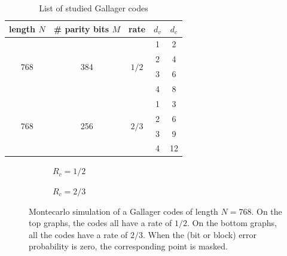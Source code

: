 \begin{table}
    \centering
    \begin{tabular}{c c c c c}
        length $N$           & \# parity bits $M$   & rate                   & $d_v$ & $d_c$ \\
        \hline \hline
        \multirow{4}{*}{768} & \multirow{4}{*}{384} & \multirow{4}{*}{$1/2$} & 1     & 2     \\
                             &                      &                        & 2     & 4     \\
                             &                      &                        & 3     & 6     \\
                             &                      &                        & 4     & 8     \\
        \hline
        \multirow{4}{*}{768} & \multirow{4}{*}{256} & \multirow{4}{*}{$2/3$} & 1     & 3     \\
                             &                      &                        & 2     & 6     \\
                             &                      &                        & 3     & 9     \\
                             &                      &                        & 4     & 12    \\
    \end{tabular}
    \caption{List of studied Gallager codes}
    \label{tab:gallager_codes}
\end{table}


\begin{figure}
    \centering
    \begin{subfigure}{\textwidth}
        \centering
        
        \caption{$R_c = 1/2$}
    \end{subfigure}%

    \begin{subfigure}{\textwidth}
        \centering
        
        \caption{$R_c = 2/3$}
    \end{subfigure}%
    \caption[Montecarlo simulation of a Gallager codes of length $N = 768$]{%
        Montecarlo simulation of a Gallager codes of length $N = 768$. On the
        top graphs, the codes all have a rate of $1/2$. On the bottom graphs,
        all the codes have a rate of $2/3$. When the (bit or block) error
        probability is zero, the corresponding point is masked.%
    }
    \label{fig:gallager_bmc}
\end{figure}

